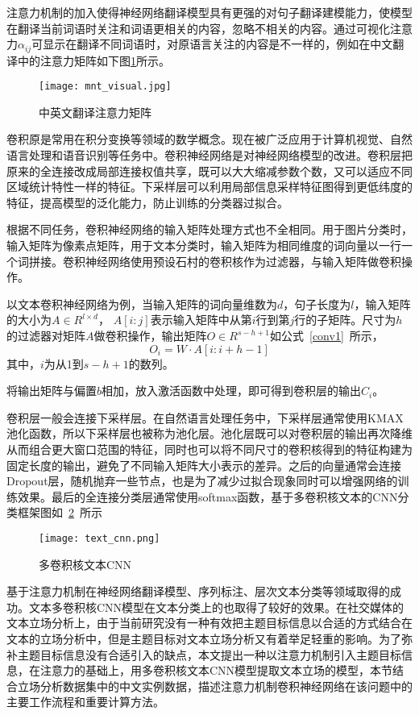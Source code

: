 注意力机制的加入使得神经网络翻译模型具有更强的对句子翻译建模能力，使模型在翻译当前词语时关注和词语更相关的内容，忽略不相关的内容。通过可视化注意力$\alpha_{ij}$可显示在翻译不同词语时，对原语言关注的内容是不一样的，例如在中文翻译中的注意力矩阵如下图\ref{english2china}所示。
\begin{figure}[htbp]
	\centering
	\texttt{[image: mnt\_visual.jpg]}
	\caption[english2china1]{中英文翻译注意力矩阵}
	\label{english2china}
\end{figure}


卷积原是常用在积分变换等领域的数学概念。现在被广泛应用于计算机视觉、自然语言处理和语音识别等任务中。卷积神经网络是对神经网络模型的改进。卷积层把原来的全连接改成局部连接权值共享，既可以大大缩减参数个数，又可以适应不同区域统计特性一样的特征。下采样层可以利用局部信息采样特征图得到更低纬度的特征，提高模型的泛化能力，防止训练的分类器过拟合。

根据不同任务，卷积神经网络的输入矩阵处理方式也不全相同。用于图片分类时，输入矩阵为像素点矩阵，用于文本分类时，输入矩阵为相同维度的词向量以一行一个词拼接。卷积神经网络使用预设石村的卷积核作为过滤器，与输入矩阵做卷积操作。

以文本卷积神经网络为例，当输入矩阵的词向量维数为$d$，句子长度为$l$，输入矩阵的大小为$A\in R^{l\times d}$， $A[i:j]$表示输入矩阵中从第$i$行到第$j$行的子矩阵。尺寸为$h$的过滤器对矩阵$A$做卷积操作，输出矩阵$O\in R^{s-h+1}$如公式~\ref{conv1}~所示，
\begin{equation}\label{conv1}
O_i=W\cdot A[i:i+h-1]
\end{equation}
其中，$i$为从1到$s-h+1$的数列。

将输出矩阵与偏置$b$相加，放入激活函数中处理，即可得到卷积层的输出$C_i$。

卷积层一般会连接下采样层。在自然语言处理任务中，下采样层通常使用KMAX池化函数，所以下采样层也被称为池化层。池化层既可以对卷积层的输出再次降维从而组合更大窗口范围的特征，同时也可以将不同尺寸的卷积核得到的特征构建为固定长度的输出，避免了不同输入矩阵大小表示的差异。之后的向量通常会连接Dropout层，随机抛弃一些节点，也是为了减少过拟合现象同时可以增强网络的训练效果。最后的全连接分类层通常使用softmax函数，基于多卷积核文本的CNN分类框架图如~\ref{multiCNN}~所示
\begin{figure}[htbp]
	\centering
	\texttt{[image: text\_cnn.png]}
	\caption{多卷积核文本CNN}
	\label{multiCNN}
\end{figure}
基于注意力机制在神经网络翻译模型、序列标注、层次文本分类等领域取得的成功。文本多卷积核CNN模型在文本分类上的也取得了较好的效果。在社交媒体的文本立场分析上，由于当前研究没有一种有效把主题目标信息以合适的方式结合在文本的立场分析中，但是主题目标对文本立场分析又有着举足轻重的影响。为了弥补主题目标信息没有合适引入的缺点，本文提出一种以注意力机制引入主题目标信息，在注意力的基础上，用多卷积核文本CNN模型提取文本立场的模型，本节结合立场分析数据集中的中文实例数据，描述注意力机制卷积神经网络在该问题中的主要工作流程和重要计算方法。



